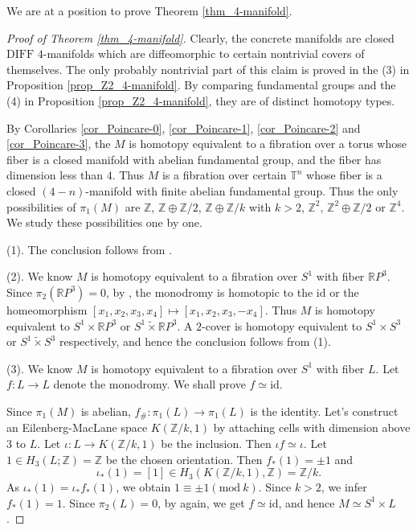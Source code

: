 \documentclass[12pt]{amsart}
\theoremstyle{plain}
\theoremstyle{definition}
\theoremstyle{question}
\theoremstyle{remark}
\theoremstyle{assumption}
\numberwithin{equation}{section}
\theoremstyle{bigthm}
\begin{document}
We are at a position to prove Theorem \ref{thm_4-manifold}.
\begin{proof}[Proof of Theorem \ref{thm_4-manifold}]
Clearly, the concrete manifolds are closed $\mathrm{DIFF}$ $4$-manifolds which are diffeomorphic to certain nontrivial covers of themselves. The only probably nontrivial part of this claim is proved in the (3) in Proposition \ref{prop_Z2_4-manifold}. By comparing fundamental groups and the (4) in Proposition \ref{prop_Z2_4-manifold}, they are of distinct homotopy types.

By Corollaries \ref{cor_Poincare-0}, \ref{cor_Poincare-1}, \ref{cor_Poincare-2} and \ref{cor_Poincare-3}, the $M$ is homotopy equivalent to a fibration over a torus whose fiber is a closed manifold with abelian fundamental group, and the fiber has dimension less than $4$. Thus $M$ is a fibration over certain $\mathbb{T}^{n}$ whose fiber is a closed $(4-n)$-manifold with finite abelian fundamental group. Thus the only possibilities of $\pi_{1} (M)$ are $\mathbb{Z}$, $\mathbb{Z} \oplus \mathbb{Z} /2$, $\mathbb{Z} \oplus \mathbb{Z} /k$ with $k>2$, $\mathbb{Z}^{2}$, $\mathbb{Z}^{2} \oplus \mathbb{Z} /2$ or $\mathbb{Z}^{4}$. We study these possibilities one by one.

(1). The conclusion follows from \cite[Theorem~E]{Qin_Su_Wang}.

(2). We know $M$ is homotopy equivalent to a fibration over $S^{1}$ with fiber $\mathbb{R}P^{3}$. Since $\pi_{2} (\mathbb{R}P^{3}) =0$, by \cite[Theorem~IIb]{Olum}, the monodromy is homotopic to the $\mathrm{id}$ or the homeomorphism $[x_{1}, x_{2}, x_{3}, x_{4}] \mapsto [x_{1}, x_{2}, x_{3}, -x_{4}]$. Thus $M$ is homotopy equivalent to $S^{1} \times \mathbb{R}P^{3}$ or $S^{1} \tilde{\times} \mathbb{R}P^{3}$. A $2$-cover is homotopy equivalent to $S^{1} \times S^{3}$ or $S^{1} \tilde{\times} S^{3}$ respectively, and hence the conclusion follows from (1).

(3). We know $M$ is homotopy equivalent to a fibration over $S^{1}$ with fiber $L$. Let $f \colon  L \rightarrow L$ denote the monodromy. We shall prove $f \simeq \mathrm{id}$.

Since $\pi_{1} (M)$ is abelian, $f_{\#} \colon  \pi_{1} (L) \rightarrow \pi_{1} (L)$ is the identity. Let's construct an Eilenberg-MacLane space $K(\mathbb{Z}/k, 1)$ by attaching cells with dimension above $3$ to $L$. Let $\iota \colon  L \rightarrow K(\mathbb{Z}/k, 1)$ be the inclusion. Then $\iota f \simeq \iota$. Let $1 \in H_{3} (L; \mathbb{Z}) = \mathbb{Z}$ be the chosen orientation. Then $f_{*} (1) = \pm 1$ and
\[
\iota_{*} (1) = [1] \in H_{3} (K(\mathbb{Z}/k, 1), \mathbb{Z}) = \mathbb{Z}/k.
\]
As $\iota_{*} (1) = \iota_{*} f_{*} (1)$, we obtain $1 \equiv \pm 1 (\mathrm{mod}\ k)$. Since $k>2$, we infer $f_{*} (1) = 1$. Since $\pi_{2} (L) =0$, by \cite[Theorem~IIb]{Olum} again, we get $f \simeq \mathrm{id}$, and hence $M \simeq S^{1} \times L$.


\end{proof}
\end{document}
